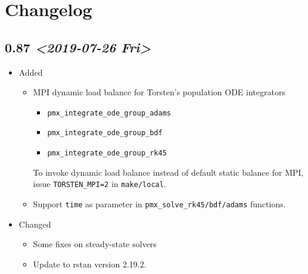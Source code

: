 \documentclass[11pt, reqno, oneside]{amsbook}
\numberwithin{equation}{chapter}
\numberwithin{figure}{chapter}
\numberwithin{table}{chapter}
\theoremstyle{remark}
\begin{document}
\section{Changelog}
\label{sec:orga7ef7d6}
\subsection{0.87 \textit{<2019-07-26 Fri>}}
\label{sec:orgce4e994}
\begin{itemize}
\item Added
\label{sec:orgfe1f2b3}
\begin{itemize}
\item MPI dynamic load balance for Torsten's population ODE integrators
\begin{itemize}
\item \texttt{pmx_integrate_ode_group_adams}
\item \texttt{pmx_integrate_ode_group_bdf}
\item \texttt{pmx_integrate_ode_group_rk45}
\end{itemize}
To invoke dynamic load balance instead of default static
balance for MPI, issue \texttt{TORSTEN\_MPI=2} in \texttt{make/local}.
\item Support \texttt{time} as parameter in \texttt{pmx_solve_rk45/bdf/adams}
functions.
\end{itemize}
\item Changed
\label{sec:org991e6b4}
\begin{itemize}
\item Some fixes on steady-state solvers
\item Update to rstan version 2.19.2.
\end{itemize}
\end{itemize}
\end{document}

